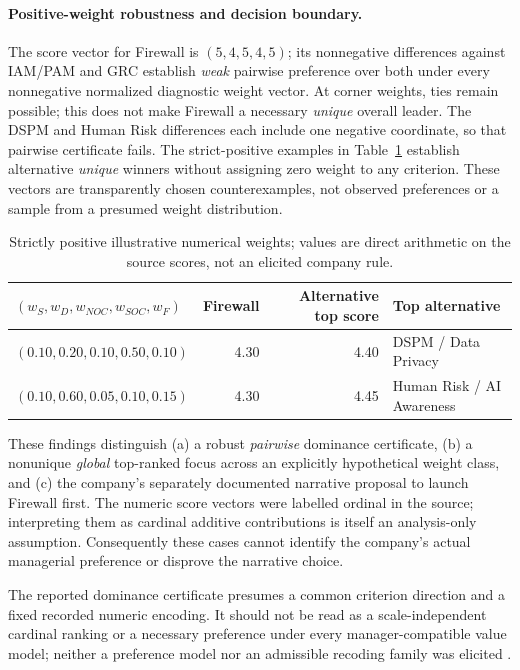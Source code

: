 \documentclass[systems,article,submit,moreauthors]{Definitions/mdpi}
\begin{document}
\paragraph{Positive-weight robustness and decision boundary.}
The score vector for Firewall is $(5,4,5,4,5)$; its nonnegative differences against IAM/PAM and GRC establish \emph{weak} pairwise preference over both under every nonnegative normalized diagnostic weight vector. At corner weights, ties remain possible; this does not make Firewall a necessary \emph{unique} overall leader. The DSPM and Human Risk differences each include one negative coordinate, so that pairwise certificate fails. The strict-positive examples in Table~\ref{tab:positive-weights} establish alternative \emph{unique} winners without assigning zero weight to any criterion. These vectors are transparently chosen counterexamples, not observed preferences or a sample from a presumed weight distribution.
\begin{table}[H]
\centering\footnotesize
\caption{Strictly positive illustrative numerical weights; values are direct arithmetic on the source scores, not an elicited company rule.}
\label{tab:positive-weights}
\begin{tabularx}{\linewidth}{>{\raggedright\arraybackslash}p{4.0cm} r r X}
\toprule
$(w_S,w_D,w_{NOC},w_{SOC},w_F)$ & Firewall & Alternative top score & Top alternative\\
\midrule
$(0.10,0.20,0.10,0.50,0.10)$ & 4.30 & 4.40 & DSPM / Data Privacy\\
$(0.10,0.60,0.05,0.10,0.15)$ & 4.30 & 4.45 & Human Risk / AI Awareness\\
\bottomrule
\end{tabularx}
\end{table}
These findings distinguish (a) a robust \emph{pairwise} dominance certificate, (b) a nonunique \emph{global} top-ranked focus across an explicitly hypothetical weight class, and (c) the company's separately documented narrative proposal to launch Firewall first. The numeric score vectors were labelled ordinal in the source; interpreting them as cardinal additive contributions is itself an analysis-only assumption. Consequently these cases cannot identify the company's actual managerial preference or disprove the narrative choice.

The reported dominance certificate presumes a common criterion direction and a fixed recorded numeric encoding. It should not be read as a scale-independent cardinal ranking or a necessary preference under every manager-compatible value model; neither a preference model nor an admissible recoding family was elicited \cite{Greco2008,PunkkaSalo2014}.
\end{document}
